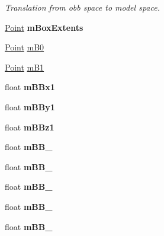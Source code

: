 \begin{DoxyCompactItemize}
\begin{DoxyCompactList}\small\item\em Translation from obb space to model space. \end{DoxyCompactList}\item 
\hyperlink{classPoint}{Point} {\bfseries m\+Box\+Extents}\hypertarget{classOBBCollider_a85cf33fc7c9905f3eb92f50d8c5e85ee}{}\label{classOBBCollider_a85cf33fc7c9905f3eb92f50d8c5e85ee}

\item 
\hyperlink{classPoint}{Point} \hyperlink{classOBBCollider_ababfe89f659ab27311d469a5df6f0549}{m\+B0}
\item 
\hyperlink{classPoint}{Point} \hyperlink{classOBBCollider_a465c36ae12538e771dd86148e2ce595d}{m\+B1}
\item 
float {\bfseries m\+B\+Bx1}\hypertarget{classOBBCollider_a5b9422d324719a2d111012eb774d417a}{}\label{classOBBCollider_a5b9422d324719a2d111012eb774d417a}

\item 
float {\bfseries m\+B\+By1}\hypertarget{classOBBCollider_a99be976cae0cdb329ecbbc55b71a1708}{}\label{classOBBCollider_a99be976cae0cdb329ecbbc55b71a1708}

\item 
float {\bfseries m\+B\+Bz1}\hypertarget{classOBBCollider_acf538636f3f399f017abd44bef2bd40c}{}\label{classOBBCollider_acf538636f3f399f017abd44bef2bd40c}

\item 
float {\bfseries m\+B\+B\+\_}\hypertarget{classOBBCollider_ab3bbbd2d415083919b4c5f346e19837d}{}\label{classOBBCollider_ab3bbbd2d415083919b4c5f346e19837d}

\item 
float {\bfseries m\+B\+B\+\_}\hypertarget{classOBBCollider_a22da5eeed48b4cc2380972a959cb2abc}{}\label{classOBBCollider_a22da5eeed48b4cc2380972a959cb2abc}

\item 
float {\bfseries m\+B\+B\+\_}\hypertarget{classOBBCollider_ab34c62840fc63a5c3d98714d6b460f19}{}\label{classOBBCollider_ab34c62840fc63a5c3d98714d6b460f19}

\item 
float {\bfseries m\+B\+B\+\_}\hypertarget{classOBBCollider_a372957c5d34150815500851c2dde6e7c}{}\label{classOBBCollider_a372957c5d34150815500851c2dde6e7c}

\item 
float {\bfseries m\+B\+B\+\_}\hypertarget{classOBBCollider_aae145764ee071112cd9bd7528c40a60d}{}\label{classOBBCollider_aae145764ee071112cd9bd7528c40a60d}


\end{DoxyCompactItemize}
